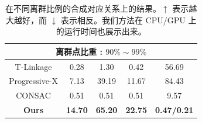 \begin{table}[ht]
\begin{tabular}{ccccc}
        \hline
        \multicolumn{5}{c}{离群点比重 : $90\%\sim99\%$} \\
        \hline
        T-Linkage & 0.28 & 1.30 & 0.42 & 56.69 \\
        Progressive-X & 7.13 & 39.19 & 11.67 & 84.43\\
        CONSAC & 0.51 & 0.51 & 0.51 & 9.57  \\
        \textbf{Ours} & \textbf{14.70} & \textbf{65.20} & \textbf{22.75} & \textbf{0.47/0.21} \\ %
        \bottomrule

    \end{tabular}
    \caption{在不同离群比例的合成对应关系上的结果。$\uparrow$ 表示越大越好，而 $\downarrow$ 表示相反。我们方法在 CPU/GPU 上的运行时间也展示出来。}
    \label{tab:mm}
    \end{table}
    
